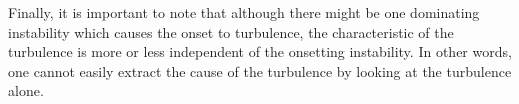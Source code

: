 Finally, it is important to note that although there might be one dominating instability which causes the onset to turbulence, the characteristic of the turbulence is more or less independent of the onsetting instability.
In other words, one cannot easily extract the cause of the turbulence by looking at the turbulence alone.
